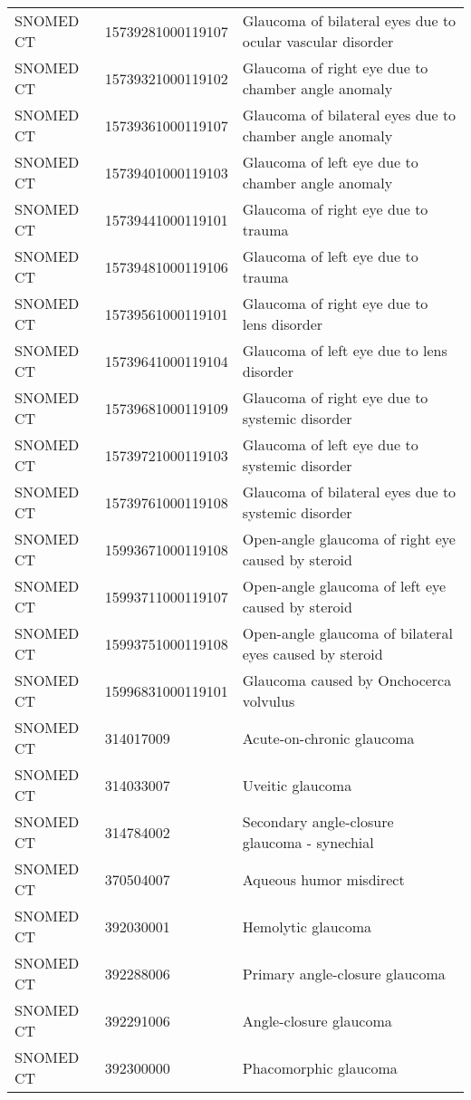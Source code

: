 \begin{longtable}{p{}p{}p{}}
  SNOMED CT & 15739281000119107 & Glaucoma of bilateral eyes due to ocular vascular disorder \\ 
  SNOMED CT & 15739321000119102 & Glaucoma of right eye due to chamber angle anomaly \\ 
  SNOMED CT & 15739361000119107 & Glaucoma of bilateral eyes due to chamber angle anomaly \\ 
  SNOMED CT & 15739401000119103 & Glaucoma of left eye due to chamber angle anomaly \\ 
  SNOMED CT & 15739441000119101 & Glaucoma of right eye due to trauma \\ 
  SNOMED CT & 15739481000119106 & Glaucoma of left eye due to trauma \\ 
  SNOMED CT & 15739561000119101 & Glaucoma of right eye due to lens disorder \\ 
  SNOMED CT & 15739641000119104 & Glaucoma of left eye due to lens disorder \\ 
  SNOMED CT & 15739681000119109 & Glaucoma of right eye due to systemic disorder \\ 
  SNOMED CT & 15739721000119103 & Glaucoma of left eye due to systemic disorder \\ 
  SNOMED CT & 15739761000119108 & Glaucoma of bilateral eyes due to systemic disorder \\ 
  SNOMED CT & 15993671000119108 & Open-angle glaucoma of right eye caused by steroid \\ 
  SNOMED CT & 15993711000119107 & Open-angle glaucoma of left eye caused by steroid \\ 
  SNOMED CT & 15993751000119108 & Open-angle glaucoma of bilateral eyes caused by steroid \\ 
  SNOMED CT & 15996831000119101 & Glaucoma caused by Onchocerca volvulus \\ 
  SNOMED CT & 314017009 & Acute-on-chronic glaucoma \\ 
  SNOMED CT & 314033007 & Uveitic glaucoma \\ 
  SNOMED CT & 314784002 & Secondary angle-closure glaucoma - synechial \\ 
  SNOMED CT & 370504007 & Aqueous humor misdirect \\ 
  SNOMED CT & 392030001 & Hemolytic glaucoma \\ 
  SNOMED CT & 392288006 & Primary angle-closure glaucoma \\ 
  SNOMED CT & 392291006 & Angle-closure glaucoma \\ 
  SNOMED CT & 392300000 & Phacomorphic glaucoma \\ 

\end{longtable}
